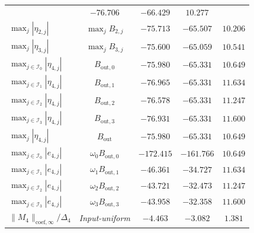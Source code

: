\begin{table}[H]
\begin{minipage}{0.90\linewidth}
\begin{tabularx}{\linewidth}{>{\centering\arraybackslash}Xcccc}
 & $-76.706$ & $-66.429$ & $10.277$\\
$\max_j|\eta_{2,j}|$ & $\max_jB_{2,j}$
 & $-75.713$ & $-65.507$ & $10.206$\\
\rowcolor{black!5}
$\max_j|\eta_{3,j}|$ & $\max_jB_{3,j}$
 & $-75.600$ & $-65.059$ & $10.541$\\
$\max_{j\in\mathcal I_0}|\eta_{4,j}|$ & $B_{\mathrm{out},0}$
 & $-75.980$ & $-65.331$ & $10.649$\\
\rowcolor{black!5}
$\max_{j\in\mathcal I_1}|\eta_{4,j}|$ & $B_{\mathrm{out},1}$
 & $-76.965$ & $-65.331$ & $11.634$\\
$\max_{j\in\mathcal I_2}|\eta_{4,j}|$ & $B_{\mathrm{out},2}$
 & $-76.578$ & $-65.331$ & $11.247$\\
\rowcolor{black!5}
$\max_{j\in\mathcal I_3}|\eta_{4,j}|$ & $B_{\mathrm{out},3}$
 & $-76.931$ & $-65.331$ & $11.600$\\
$\max_j|\eta_{4,j}|$ & $B_{\mathrm{out}}$
 & $-75.980$ & $-65.331$ & $10.649$\\
\midrule
\rowcolor{black!5}
$\max_{j\in\mathcal I_0}|e_{4,j}|$ & $\omega_0B_{\mathrm{out},0}$
 & $-172.415$ & $-161.766$ & $10.649$\\
$\max_{j\in\mathcal I_1}|e_{4,j}|$ & $\omega_1B_{\mathrm{out},1}$
 & $-46.361$ & $-34.727$ & $11.634$\\
\rowcolor{black!5}
$\max_{j\in\mathcal I_2}|e_{4,j}|$ & $\omega_2B_{\mathrm{out},2}$
 & $-43.721$ & $-32.473$ & $11.247$\\
$\max_{j\in\mathcal I_3}|e_{4,j}|$ & $\omega_3B_{\mathrm{out},3}$
 & $-43.958$ & $-32.358$ & $11.600$\\
\rowcolor{black!5}
$\|M_4\|_{\mathrm{coef},\infty}/\Delta_4$ & \textit{Input-uniform}
 & $-4.463$ & $-3.082$ & $1.381$\\
\bottomrule
\end{tabularx}
\end{minipage}
\end{table}
